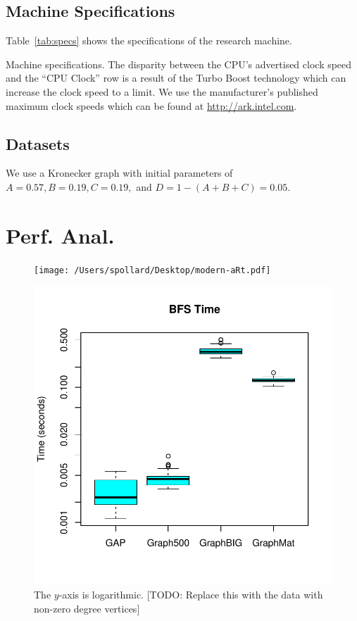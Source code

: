 \documentclass[conference]{IEEEtran}
\begin{document}
\subsection{Machine Specifications}
Table~\ref{tab:specs} shows the specifications of the research machine.

\begin{table}[!htb]
	\centering
	\caption{Machine specifications. The disparity between the CPU's advertised clock speed and the ``CPU Clock'' row is a result of the Turbo Boost technology which can increase the clock speed to a limit. We use the manufacturer's published maximum clock speeds which can be found at \url{http://ark.intel.com}.}
	\label{tab:specs}
\end{table}

\subsection{Datasets}
We use a Kronecker graph \cite{Leskovec:2010:Kronecker} with initial parameters of $A = 0.57, B = 0.19, C = 0.19,$ and $D = 1-(A+B+C) = 0.05$.

\section{Perf. Anal.}

\begin{figure}[!htb]
	\texttt{[image: /Users/spollard/Desktop/modern-aRt.pdf]}
\end{figure}

\begin{figure}
	\centering
	\includegraphics[width=0.8\columnwidth]{graphics/bfs_time.pdf}
	\vspace{-18pt}
	\caption{The $y$-axis is logarithmic. [TODO: Replace this with the data with non-zero degree vertices]}
	\label{fig:bfs-time}
\end{figure}
\end{document}
